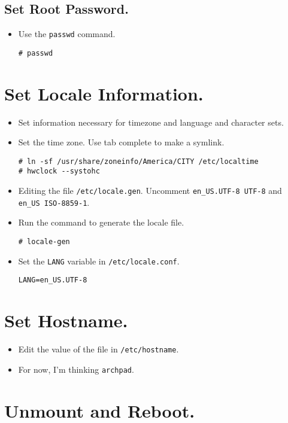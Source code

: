 \documentclass{article}
\begin{document}
\subsection{Set Root Password.}

\begin{itemize}
  \item Use the \verb|passwd| command.
\begin{verbatim}
# passwd
\end{verbatim}
\end{itemize}

\section{Set Locale Information.}

\begin{itemize}
  \item Set information necessary for timezone and language and character sets.
  \item Set the time zone. Use tab complete to make a symlink.
\begin{verbatim}
# ln -sf /usr/share/zoneinfo/America/CITY /etc/localtime
# hwclock --systohc
\end{verbatim}
  \item Editing the file \verb|/etc/locale.gen|. Uncomment
    \verb|en_US.UTF-8 UTF-8| and \verb|en_US ISO-8859-1|.
  \item Run the command to generate the locale file.
\begin{verbatim}
# locale-gen
\end{verbatim}
  \item Set the \verb|LANG| variable in \verb|/etc/locale.conf|.
\begin{verbatim}
LANG=en_US.UTF-8
\end{verbatim}
\end{itemize}

\section{Set Hostname.}

\begin{itemize}
  \item Edit the value of the file in \verb|/etc/hostname|.
  \item For now, I'm thinking \verb|archpad|.
\end{itemize}

\section{Unmount and Reboot.}
\end{document}
